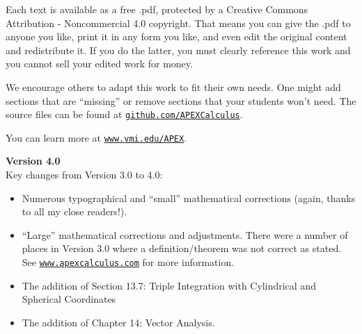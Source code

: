 Each text is available as a free .pdf, protected by a Creative Commons Attribution - Noncommercial 4.0 copyright. That  means you can give the .pdf to anyone you like, print it in any form you like, and even edit the original content and redistribute it. If you do the latter, you must  clearly reference this work and you cannot sell your edited work for money.

We encourage others to adapt this work to fit their own needs. One might add sections that are ``missing'' or remove sections that your students won't need. The source files can be found at \texttt{\href{https://github.com/APEXCalculus}{github.com/APEXCalculus}}.

You can learn more at \texttt{\href{http://www.vmi.edu/APEX}{www.vmi.edu/APEX}}.\\
\thispagestyle{empty}

\noindent\textbf{\large Version 4.0}\\

Key changes from Version 3.0 to 4.0:
\begin{itemize}
	\item Numerous typographical and ``small'' mathematical corrections (again, thanks to all my close readers!).
	\item	``Large'' mathematical corrections and adjustments. There were a number of places in Version 3.0 where a definition/theorem was not correct as stated. See \texttt{\href{http://apexcalculus.com}{www.apexcalculus.com}} for more information.
	\item	The addition of Section 13.7: Triple Integration with Cylindrical and Spherical Coordinates
	\item	The addition of Chapter 14: Vector Analysis.
\end{itemize}
\thispagestyle{empty}

